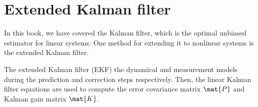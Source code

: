 \section{Extended Kalman filter}
\label{sec:ekf}

In this book, we have covered the Kalman filter, which is the optimal unbiased
estimator for linear \glspl{system}. One method for extending it to nonlinear
systems is the extended Kalman filter.

The extended Kalman filter (EKF)  the
dynamical and measurement models during the prediction and correction steps
respectively. Then, the linear Kalman filter equations are used to compute the
error covariance matrix $\mat{P}$ and Kalman gain matrix $\mat{K}$.

